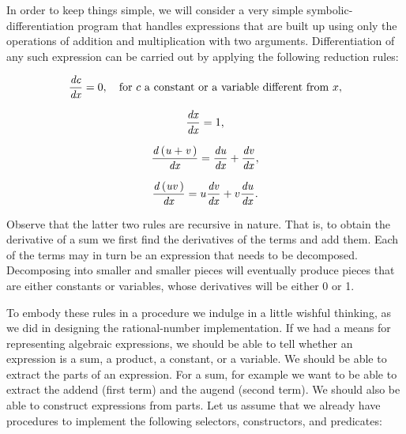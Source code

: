 In order to keep things simple, we will consider a very simple
symbolic-differentiation program that handles expressions that are built up
using only the operations of addition and multiplication with two arguments.
Differentiation of any such expression can be carried out by applying the
following reduction rules:
\begin{comment}

\begin{example}
dc
-- = 0  for c a constant, or a variable different from x
dx

dx
-- = 1
dx

d(u + v)   du   dv
-------- = -- + --
   dx      dx   dx

d(uv)     / dv \     / du \
----- = u | -- | + v | -- |
 dx       \ dx /     \ dx /
\end{example}

\end{comment}

$$
{{\it dc} \over {\it dx}} 		= 0,
	\quad {\rm for\ } c\ {\rm a\ constant\ or\ a\ variable\ different\ from\ } x,
$$


$$
{{\it dx} \over {\it dx}} 		= 1,
$$


$$
{{\it d\,(u + v\,)} \over {\it dx}} 	= {{\it du} \over {\it dx}} + {{\it dv} \over {\it dx}},
$$


$$
{{\it d\,(uv\,)} \over {\it dx}} 	= u {{\it dv} \over {\it dx}} + v {{\it du} \over {\it dx}}.
$$

\noindent
Observe that the latter two rules are recursive in nature.  That is, to obtain
the derivative of a sum we first find the derivatives of the terms and add
them.  Each of the terms may in turn be an expression that needs to be
decomposed.  Decomposing into smaller and smaller pieces will eventually
produce pieces that are either constants or variables, whose derivatives will
be either 0 or 1.

To embody these rules in a procedure we indulge in a little wishful thinking,
as we did in designing the rational-number implementation.  If we had a means
for representing algebraic expressions, we should be able to tell whether an
expression is a sum, a product, a constant, or a variable.  We should be able
to extract the parts of an expression.  For a sum, for example we want to be
able to extract the addend (first term) and the augend (second term).  We
should also be able to construct expressions from parts.  Let us assume that we
already have procedures to implement the following selectors, constructors, and
predicates:

